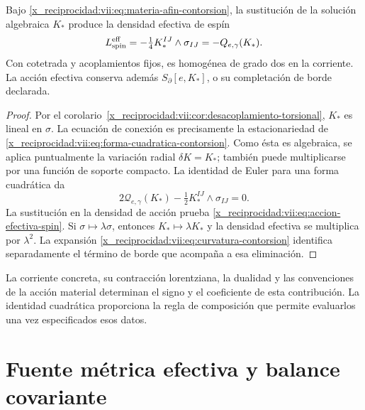 \begin{HMTCompactSection}
\begin{theorem}
\label{x_reciprocidad:vii:thm:respuesta-cuadratica}
Bajo \eqref{x_reciprocidad:vii:eq:materia-afin-contorsion}, la sustitución de la
solución algebraica \(K_*\) produce la densidad efectiva de espín
\begin{equation}
 \mathcal L_{\rm spin}^{\rm eff}
 =-\tfrac14 K_*^{IJ}\wedge\sigma_{IJ}
 =-\mathcal Q_{e,\gamma}(K_*).
 \label{x_reciprocidad:vii:eq:accion-efectiva-spin}
\end{equation}
Con cotetrada y acoplamientos fijos, es homogénea de grado dos en
la corriente. La acción efectiva conserva además
\(S_\partial[e,K_*]\), o su completación de borde declarada.
\end{theorem}
\begin{proof}
Por el corolario~\ref{x_reciprocidad:vii:cor:desacoplamiento-torsional},
\(K_*\) es lineal en \(\sigma\). La ecuación de conexión es
precisamente la estacionariedad de
\eqref{x_reciprocidad:vii:eq:forma-cuadratica-contorsion}. Como ésta es algebraica,
se aplica puntualmente la variación radial \(\delta K=K_*\);
también puede multiplicarse por una función de soporte compacto.
La identidad de Euler para una forma cuadrática da
\[
 2\mathcal Q_{e,\gamma}(K_*)
             -\tfrac12K_*^{IJ}\wedge\sigma_{IJ}=0.
\]
La sustitución en la densidad de acción prueba
\eqref{x_reciprocidad:vii:eq:accion-efectiva-spin}. Si
\(\sigma\mapsto\lambda\sigma\), entonces
\(K_*\mapsto\lambda K_*\) y la densidad efectiva se multiplica
por \(\lambda^2\). La expansión
\eqref{x_reciprocidad:vii:eq:curvatura-contorsion} identifica separadamente el
término de borde que acompaña a esa eliminación.
\end{proof}

La corriente concreta, su contracción lorentziana, la dualidad y las
convenciones de la acción material determinan el signo y el coeficiente
de esta contribución. La identidad cuadrática proporciona la regla de
composición que permite evaluarlos una vez especificados esos datos.

\section{Fuente métrica efectiva y balance covariante}
\label{x_reciprocidad:vii:subsec:fuente-metrica-efectiva}


\end{HMTCompactSection}
